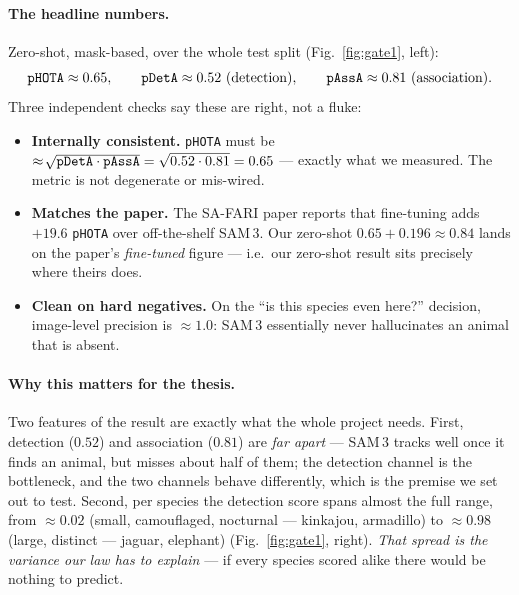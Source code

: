 \documentclass[11pt,a4paper]{article}
\newcommand{\code}[1]{\texttt{#1}}
\begin{document}
\paragraph{The headline numbers.}
Zero-shot, mask-based, over the whole test split (Fig.~\ref{fig:gate1}, left):
\[
  \text{\code{pHOTA}} \approx 0.65,\qquad
  \text{\code{pDetA}} \approx 0.52\ \text{(detection)},\qquad
  \text{\code{pAssA}} \approx 0.81\ \text{(association)}.
\]
Three independent checks say these are right, not a fluke:
\begin{itemize}
  \item \textbf{Internally consistent.} \code{pHOTA} must be $\approx\!\sqrt{\text{\code{pDetA}}\cdot
        \text{\code{pAssA}}}=\sqrt{0.52\cdot0.81}=0.65$ --- exactly what we measured. The metric is not
        degenerate or mis-wired.
  \item \textbf{Matches the paper.} The SA-FARI paper reports that fine-tuning adds $+19.6$ \code{pHOTA}
        over off-the-shelf SAM\,3. Our zero-shot $0.65+0.196\approx0.84$ lands on the paper's
        \emph{fine-tuned} figure --- i.e.\ our zero-shot result sits precisely where theirs does.
  \item \textbf{Clean on hard negatives.} On the ``is this species even here?'' decision, image-level
        precision is $\approx\!1.0$: SAM\,3 essentially never hallucinates an animal that is absent.
\end{itemize}

\paragraph{Why this matters for the thesis.}
Two features of the result are exactly what the whole project needs. First, detection ($0.52$) and
association ($0.81$) are \emph{far apart} --- SAM\,3 tracks well once it finds an animal, but misses about
half of them; the detection channel is the bottleneck, and the two channels behave differently, which is
the premise we set out to test. Second, per species the detection score spans almost the full range, from
$\approx\!0.02$ (small, camouflaged, nocturnal --- kinkajou, armadillo) to $\approx\!0.98$ (large, distinct
--- jaguar, elephant) (Fig.~\ref{fig:gate1}, right). \emph{That spread is the variance our law has to
explain} --- if every species scored alike there would be nothing to predict.
\end{document}
